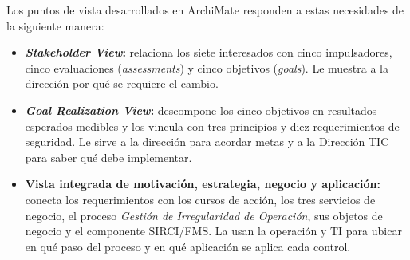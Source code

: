 Los puntos de vista desarrollados en ArchiMate \parencite{archimate2022,modeloArchimateCCI2026} responden a estas necesidades de la siguiente manera:

\begin{itemize}
	\item \textbf{\textit{Stakeholder View}:} relaciona los siete interesados con cinco impulsadores, cinco evaluaciones (\textit{assessments}) y cinco objetivos (\textit{goals}). Le muestra a la dirección por qué se requiere el cambio.
	\item \textbf{\textit{Goal Realization View}:} descompone los cinco objetivos en resultados esperados medibles y los vincula con tres principios y diez requerimientos de seguridad. Le sirve a la dirección para acordar metas y a la Dirección TIC para saber qué debe implementar.
	\item \textbf{Vista integrada de motivación, estrategia, negocio y aplicación:} conecta los requerimientos con los cursos de acción, los tres servicios de negocio, el proceso \textit{Gestión de Irregularidad de Operación}, sus objetos de negocio y el componente SIRCI/FMS. La usan la operación y TI para ubicar en qué paso del proceso y en qué aplicación se aplica cada control.
\end{itemize}